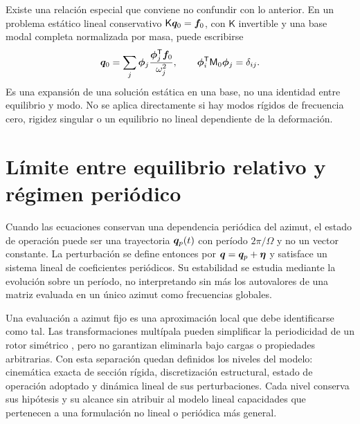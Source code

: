 Existe una relación especial que conviene no confundir con lo anterior. En un problema estático lineal conservativo $\mathsf K\bm{q}_0=\bm{f}_0$, con $\mathsf K$ invertible y una base modal completa normalizada por masa, puede escribirse
\begin{equation}
 \bm{q}_0=\sum_j\bm{\phi}_j\frac{\bm{\phi}_j^{\mathsf T}\bm{f}_0}{\omega_j^2},
 \qquad\bm{\phi}_i^{\mathsf T}\mathsf M_0\bm{\phi}_j=\delta_{ij}.
\end{equation}
Es una expansión de una solución estática en una base, no una identidad entre equilibrio y modo. No se aplica directamente si hay modos rígidos de frecuencia cero, rigidez singular o un equilibrio no lineal dependiente de la deformación.

\section{Límite entre equilibrio relativo y régimen periódico}
Cuando las ecuaciones conservan una dependencia periódica del azimut, el estado de operación puede ser una trayectoria $\bm{q}_p(t)$ con período $2\pi/\Omega$ y no un vector constante. La perturbación se define entonces por $\bm{q}=\bm{q}_p+\bm{\eta}$ y satisface un sistema lineal de coeficientes periódicos. Su estabilidad se estudia mediante la evolución sobre un período, no interpretando sin más los autovalores de una matriz evaluada en un único azimut como frecuencias globales.

Una evaluación a azimut fijo es una aproximación local que debe identificarse como tal. Las transformaciones multípala pueden simplificar la periodicidad de un rotor simétrico \cite{bir}, pero no garantizan eliminarla bajo cargas o propiedades arbitrarias. Con esta separación quedan definidos los niveles del modelo: cinemática exacta de sección rígida, discretización estructural, estado de operación adoptado y dinámica lineal de sus perturbaciones. Cada nivel conserva sus hipótesis y su alcance sin atribuir al modelo lineal capacidades que pertenecen a una formulación no lineal o periódica más general.
\appendix
